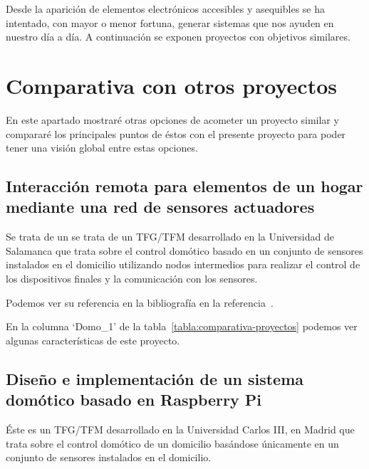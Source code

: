 \begin{comment}
\capitulo{6}{Trabajos relacionados}
Este apartado sería parecido a un estado del arte de una tesis o tesina. En un trabajo final grado no parece obligada su presencia, aunque se puede dejar a juicio del tutor el incluir un pequeño resumen comentado de los trabajos y proyectos ya realizados en el campo del proyecto en curso. 
\end{comment}

Desde la aparición de elementos electrónicos accesibles y asequibles se ha intentado, con mayor o menor fortuna, generar sistemas que nos ayuden en nuestro día a día. A continuación se exponen proyectos con objetivos similares.

\section{Comparativa con otros proyectos}
En este apartado mostraré otras opciones de acometer un proyecto similar y compararé los principales puntos de éstos con el presente proyecto para poder tener una visión global entre estas opciones.

\subsection{Interacción remota para elementos de un hogar mediante una red de sensores actuadores}\label{Proy_Domo_1}
Se trata de un  se trata de un TFG/TFM desarrollado en la Universidad de Salamanca que trata sobre el control domótico basado en un conjunto de sensores instalados en el domicilio utilizando nodos intermedios para realizar el control de los dispositivos finales y la comunicación con los sensores.

Podemos ver su referencia en la bibliografía en la referencia~\cite{misc:TFG_Salamanca}.

En la columna `Domo\_1' de la tabla~\ref{tabla:comparativa-proyectos} podemos ver algunas características de este proyecto.

\subsection{Diseño e implementación de un sistema domótico basado en Raspberry Pi}\label{Proy_Domo_2}
Éste es un TFG/TFM desarrollado en la Universidad Carlos III, en Madrid que trata sobre el control domótico de un domicilio basándose únicamente en un conjunto de sensores instalados en el domicilio.

